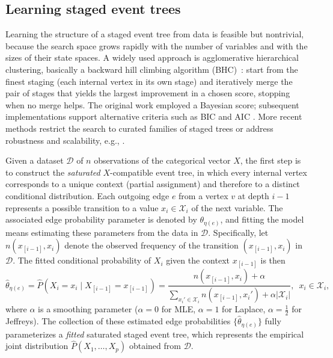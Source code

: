 \documentclass[preprint,12pt]{elsarticle}
\begin{document}
\subsection{Learning staged event trees}

Learning the structure of a staged event tree from data is feasible but nontrivial, because the search space grows rapidly with the number of variables and with the sizes of their state spaces. A widely used approach is agglomerative hierarchical clustering, basically a backward hill climbing algorithm (BHC)~\citep{freeman2011bayesian}: start from the finest staging (each internal vertex in its own stage) and iteratively merge the pair of stages that yields the largest improvement in a chosen score, stopping when no merge helps. The original work employed a Bayesian score; subsequent implementations support alternative criteria such as BIC and AIC \citep{JSSv102i06}. More recent methods restrict the search to curated families of staged trees or address robustness and scalability, e.g., \citep{carli2023new,leonelli2022highly,leonelli2024structural,rios2024scalable}.

Given a dataset $\mathcal{D}$ of $n$ observations of the categorical vector $X$, the first step is to construct the \textit{saturated} $X$-compatible event tree, in which every internal vertex corresponds to a unique context (partial assignment) and therefore to a distinct conditional distribution. Each outgoing edge $e$ from a vertex $v$ at depth $i-1$ represents a possible transition to a value $x_i \in \mathcal{X}_i$ of the next variable. The associated edge probability parameter is denoted by $\theta_{\eta(e)}$, and fitting the model means estimating these parameters from the data in $\mathcal{D}$. Specifically, let $n(x_{[i-1]},x_i)$ denote the observed frequency of the transition $(x_{[i-1]},x_i)$ in $\mathcal{D}$. The fitted conditional probability of $X_i$ given the context $x_{[i-1]}$ is then
\[
\hat{\theta}_{\eta(e)} 
= \hat{P}(X_i=x_i \mid X_{[i-1]}=x_{[i-1]})
= \frac{n(x_{[i-1]},x_i) + \alpha}
       {\sum_{x_i' \in \mathcal{X}_i} n(x_{[i-1]},x_i') + \alpha|\mathcal{X}_i|},
\,\,\, x_i \in \mathcal{X}_i,
\]
where $\alpha$ is a smoothing parameter ($\alpha=0$ for MLE, $\alpha=1$ for Laplace, $\alpha=\tfrac12$ for Jeffreys). The collection of these estimated edge probabilities $\{\hat{\theta}_{\eta(e)}\}$ fully parameterizes a \textit{fitted} saturated staged event tree, which represents the empirical joint distribution $\hat{P}(X_1,\ldots,X_p)$ obtained from $\mathcal{D}$.
\end{document}
